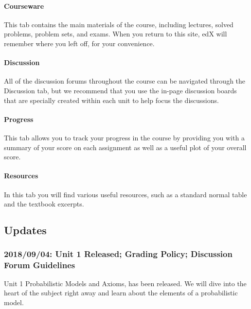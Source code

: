 \documentclass[pdftex, brazil, 12pt, twoside]{article}
\begin{document}
\paragraph{Courseware}
This tab contains the main materials of the course, including lectures, solved problems,
problem sets, and exams. When you return to this site, edX will remember where you
left off, for your convenience.

\paragraph{Discussion}
All of the discussion forums throughout the course can be navigated through the
Discussion tab, but we recommend that you use the in-page discussion boards that are
specially created within each unit to help focus the discussions.

\paragraph{Progress}
This tab allows you to track your progress in the course by providing you with a summary
of your score on each assignment as well as a useful plot of your overall score.

\paragraph{Resources}
In this tab you will find various useful resources, such as a standard normal
table and the textbook excerpts.


\subsection{Updates}
\label{welcome-updates}

\subsubsection{2018/09/04: Unit 1 Released; Grading Policy; Discussion Forum Guidelines}
\label{welcome-updates-1}

Unit 1 Probabilistic Models and Axioms, has been released.  We will dive into the
heart of the subject right away and learn about the elements of a probabilistic model. 
 
\end{document}
